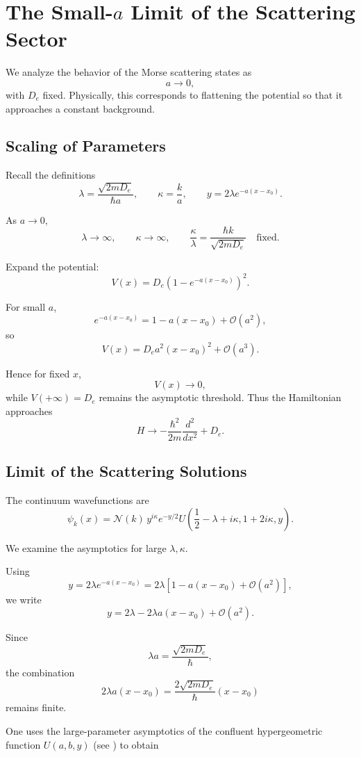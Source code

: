 \documentclass[11pt]{article}
\begin{document}
\section{The Small-$a$ Limit of the Scattering Sector}

We analyze the behavior of the Morse scattering states as
\[
a \to 0,
\]
with $D_e$ fixed. Physically, this corresponds to flattening the
potential so that it approaches a constant background.

\subsection{Scaling of Parameters}

Recall the definitions
\[
\lambda = \frac{\sqrt{2mD_e}}{\hbar a},
\qquad
\kappa = \frac{k}{a},
\qquad
y = 2\lambda e^{-a(x-x_0)}.
\]

As $a\to 0$,
\[
\lambda \to \infty,
\qquad
\kappa \to \infty,
\qquad
\frac{\kappa}{\lambda}
=
\frac{\hbar k}{\sqrt{2mD_e}}
\quad \text{fixed}.
\]

Expand the potential:
\[
V(x)
=
D_e\left(1-e^{-a(x-x_0)}\right)^2.
\]

For small $a$,
\[
e^{-a(x-x_0)}
=
1-a(x-x_0)+\mathcal O(a^2),
\]
so
\[
V(x)
=
D_e a^2 (x-x_0)^2 + \mathcal O(a^3).
\]

Hence for fixed $x$,
\[
V(x)\to 0,
\]
while $V(+\infty)=D_e$ remains the asymptotic threshold.
Thus the Hamiltonian approaches
\[
H \to -\frac{\hbar^2}{2m}\frac{d^2}{dx^2} + D_e.
\]

\subsection{Limit of the Scattering Solutions}

The continuum wavefunctions are
\[
\psi_k(x)
=
\mathcal N(k)\,
y^{i\kappa}
e^{-y/2}
U\!\left(
\frac12-\lambda+i\kappa,
1+2i\kappa,
y
\right).
\]

We examine the asymptotics for large $\lambda,\kappa$.

Using
\[
y = 2\lambda e^{-a(x-x_0)}
=
2\lambda\left[1-a(x-x_0)+\mathcal O(a^2)\right],
\]
we write
\[
y = 2\lambda - 2\lambda a(x-x_0)+\mathcal O(a^2).
\]

Since
\[
\lambda a = \frac{\sqrt{2mD_e}}{\hbar},
\]
the combination
\[
2\lambda a(x-x_0)
=
\frac{2\sqrt{2mD_e}}{\hbar}(x-x_0)
\]
remains finite.

One uses the large-parameter asymptotics of the confluent
hypergeometric function $U(a,b,y)$
(see \cite{olver})
to obtain
\end{document}
